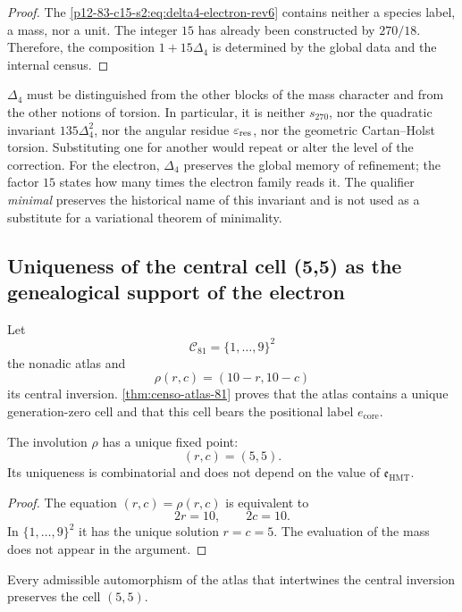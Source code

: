 \begin{proof}
The \cref{p12-83-c15-s2:eq:delta4-electron-rev6} contains neither a species label, a
mass, nor a unit. The integer \(15\) has already been constructed by \(270/18\).
Therefore, the composition \(1+15\Delta_4\) is determined by the
global data and the internal census.
\end{proof}

\(\Delta_4\) must be distinguished from the other blocks of the mass character and from the other notions of torsion. In particular, it is neither \(s_{270}\), nor the quadratic invariant \(135\Delta_4^2\), nor the angular residue \(\varepsilon_{\rm res}\), nor the geometric Cartan--Holst torsion. Substituting one for another would repeat or alter the level of the correction. For the electron, \(\Delta_4\) preserves the global memory of refinement; the factor \(15\) states how many times the electron family reads it. The qualifier \emph{minimal} preserves the historical name of this invariant and is not used as a substitute for a variational theorem of minimality.

\subsection{Uniqueness of the central cell (5,5) as the genealogical support of the electron}

Let
\[
 \mathcal C_{81}=\{1,\ldots,9\}^2
\]
the nonadic atlas and
\[
 \rho(r,c)=(10-r,10-c)
\]
its central inversion. \cref{thm:censo-atlas-81} proves that the atlas
contains a unique generation-zero cell and that this cell bears the positional
label \(e_{\mathrm{core}}\).

\begin{proposition}
\label{p12-83-c15-s2:prop:centro-electron-rev6}
The involution \(\rho\) has a unique fixed point:
\[
 \boxed{(r,c)=(5,5).}
\]
Its uniqueness is combinatorial and does not depend on the value of
\(\mathfrak e_{\mathrm{HMT}}\).
\end{proposition}

\begin{proof}
The equation \((r,c)=\rho(r,c)\) is equivalent to
\[
 2r=10,\qquad2c=10.
\]
In \(\{1,\ldots,9\}^2\) it has the unique solution \(r=c=5\). The evaluation
of the mass does not appear in the argument.
\end{proof}

\begin{corollary}
\label{p12-83-c15-s2:cor:universalidad-electron-central-rev6}
Every admissible automorphism of the atlas that intertwines the central inversion
preserves the cell \((5,5)\).
\end{corollary}

